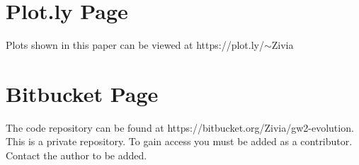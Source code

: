 \documentclass{acm_proc_article-sp}
\begin{document}


\appendix
\section{Plot.ly Page}\label{sec:one}
Plots shown in this paper can be viewed at https://plot.ly/$\sim$Zivia\section{Bitbucket Page}\label{sec:two}
The code repository can be found at https://bitbucket.org/Zivia/gw2-evolution. This is a private repository. To gain access you must be added as a contributor. Contact the author to be added.
\end{document}
